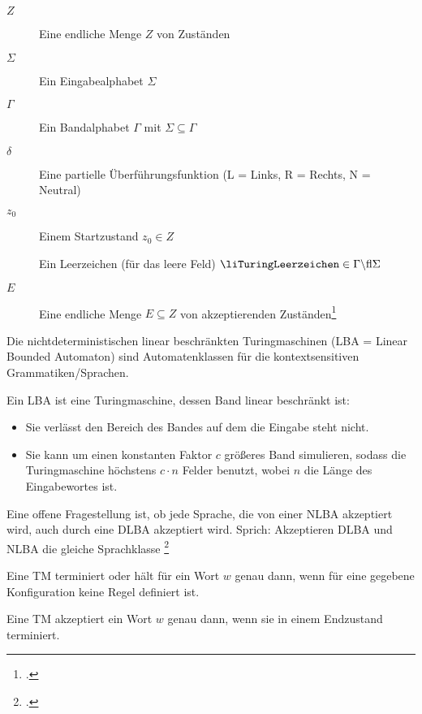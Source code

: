 \documentclass{lehramt-informatik-haupt}
\begin{document}
\begin{description}
\item[$Z$]
Eine endliche Menge $Z$ von Zuständen

\item[$\Sigma$]
Ein Eingabealphabet $\Sigma$

\item[$\Gamma$]
Ein Bandalphabet $\Gamma$ mit $\Sigma \subseteq\Gamma$

\item[$\delta$]
Eine partielle Überführungsfunktion
\liTuringUeberfuehrung (L = Links, R = Rechts, N = Neutral)

\item[$z_0$]
Einem Startzustand $z_0 \in Z$

\item[\liTuringLeerzeichen]
Ein Leerzeichen (für das leere Feld) $\liTuringLeerzeichen \in \Gamma \string\ \Sigma$

\item[$E$]
Eine endliche Menge $E \subseteq Z$ von
akzeptierenden Zuständen\footcite[Seite 21]{theo:fs:3}
\end{description}

Die nichtdeterministischen linear beschränkten Turingmaschinen
(LBA = Linear Bounded Automaton) sind Automatenklassen für die
kontextsensitiven Grammatiken/Sprachen.

Ein LBA ist eine Turingmaschine, dessen Band linear beschränkt ist:

\begin{itemize}
\item[Definition 1]

Sie verlässt den Bereich des Bandes auf dem die Eingabe steht nicht.

\item[Definition 2]

Sie kann um einen konstanten Faktor $c$ größeres Band simulieren, sodass
die Turingmaschine höchstens $c \cdot n$ Felder benutzt, wobei $n$ die
Länge des Eingabewortes ist.
\end{itemize}

Eine offene Fragestellung ist, ob jede Sprache, die von einer NLBA
akzeptiert wird, auch durch eine DLBA akzeptiert wird. Sprich:
Akzeptieren DLBA und NLBA die gleiche Sprachklasse
\footcite[Seite 10]{theo:fs:3}

Eine TM terminiert oder hält für ein Wort $w$ genau dann, wenn für
eine gegebene Konfiguration keine Regel definiert ist.

Eine TM akzeptiert ein Wort $w$ genau dann, wenn sie in einem
Endzustand terminiert.
\end{document}
